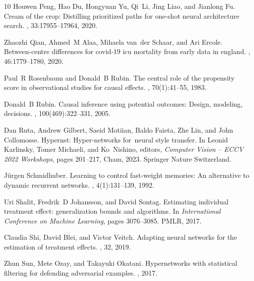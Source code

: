 \documentclass{article}
\begin{document}
\begin{thebibliography}{10}
	Houwen Peng, Hao Du, Hongyuan Yu, Qi~Li, Jing Liao, and Jianlong Fu.
	\newblock Cream of the crop: Distilling prioritized paths for one-shot neural
	architecture search.
	,
	33:17955--17964, 2020.
	
	Zhaozhi Qian, Ahmed~M Alaa, Mihaela van~der Schaar, and Ari Ercole.
	\newblock Between-centre differences for covid-19 icu mortality from early data
	in england.
	, 46:1779--1780, 2020.
	
	Paul~R Rosenbaum and Donald~B Rubin.
	\newblock The central role of the propensity score in observational studies for
	causal effects.
	, 70(1):41--55, 1983.
	
	Donald~B Rubin.
	\newblock Causal inference using potential outcomes: Design, modeling,
	decisions.
	,
	100(469):322--331, 2005.
	
	Dan Ruta, Andrew Gilbert, Saeid Motiian, Baldo Faieta, Zhe Lin, and John
	Collomosse.
	\newblock Hypernst: Hyper-networks for neural style transfer.
	\newblock In Leonid Karlinsky, Tomer Michaeli, and Ko~Nishino, editors, {\em
		Computer Vision -- ECCV 2022 Workshops}, pages 201--217, Cham, 2023. Springer
	Nature Switzerland.
	
	J{\"u}rgen Schmidhuber.
	\newblock Learning to control fast-weight memories: An alternative to dynamic
	recurrent networks.
	, 4(1):131--139, 1992.
	
	Uri Shalit, Fredrik~D Johansson, and David Sontag.
	\newblock Estimating individual treatment effect: generalization bounds and
	algorithms.
	\newblock In {\em International Conference on Machine Learning}, pages
	3076--3085. PMLR, 2017.
	
	Claudia Shi, David Blei, and Victor Veitch.
	\newblock Adapting neural networks for the estimation of treatment effects.
	, 32, 2019.
	
	Zhun Sun, Mete Ozay, and Takayuki Okatani.
	\newblock Hypernetworks with statistical filtering for defending adversarial
	examples.
	, 2017.
	

\end{thebibliography}
\end{document}

